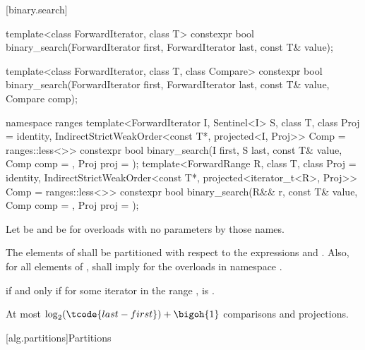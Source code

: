 [binary.search]{}

%
\begin{itemdecl}
template<class ForwardIterator, class T>
  constexpr bool
    binary_search(ForwardIterator first, ForwardIterator last,
                  const T& value);

template<class ForwardIterator, class T, class Compare>
  constexpr bool
    binary_search(ForwardIterator first, ForwardIterator last,
                  const T& value, Compare comp);

namespace ranges {
  template<ForwardIterator I, Sentinel<I> S, class T, class Proj = identity,
           IndirectStrictWeakOrder<const T*, projected<I, Proj>> Comp = ranges::less<>>
    constexpr bool binary_search(I first, S last, const T& value, Comp comp = {},
                                 Proj proj = {});
  template<ForwardRange R, class T, class Proj = identity,
           IndirectStrictWeakOrder<const T*, projected<iterator_t<R>, Proj>> Comp =
             ranges::less<>>
    constexpr bool binary_search(R&& r, const T& value, Comp comp = {},
                                 Proj proj = {});
}
\end{itemdecl}

\begin{itemdescr}
\pnum
Let  be  and
 be 
for overloads with no parameters by those names.

\pnum
\requires
The elements  of 
shall be partitioned with respect to the expressions
 and
.
Also, for all elements  of \tcode{[first, last)},
 shall imply 
for the overloads in namespace .

\pnum
\returns
{} if and only if
for some iterator  in the range ,
is .

\pnum
\complexity
At most $\log_2(\tcode{last - first}) + \bigoh{1}$ comparisons and projections.
\end{itemdescr}

[alg.partitions]{Partitions}

